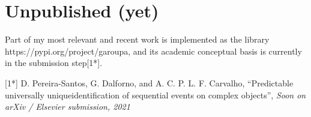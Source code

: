    \section{Unpublished (yet)}
   Part of my most relevant and recent work is implemented as the library https://pypi.org/project/garoupa, and its academic conceptual basis is currently in the submission step[1*].
\vspace{0.5cm}

[1*] D. Pereira-Santos, G. Dalforno, and A. C. P. L. F. Carvalho, “Predictable universally uniqueidentification of sequential events on complex objects”, \textit{Soon on arXiv / Elsevier submission, 2021}

\nocite{*}
\printbibliography[title=Publications]

